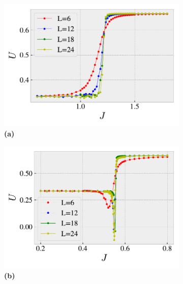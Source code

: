 \begin{figure}[!h]
	\captionsetup[subfigure]{labelformat=empty}
	\centering
	\begin{subfigure}{0.45\textwidth}
		\centering
		\includegraphics[width=\columnwidth]{figures/chapter2/BinderSecondExample.pdf}
		\caption{\textbf{(a)}}
	\end{subfigure}%
	\begin{subfigure}{0.45\textwidth}
		\centering
		\includegraphics[width=\columnwidth]{figures/chapter2/BinderFirstExample.pdf}
		\caption{\textbf{(b)}}
	\end{subfigure}
	\par\bigskip
	\begin{subfigure}{0.45\textwidth}
		\centering

\end{subfigure}
\end{figure}
